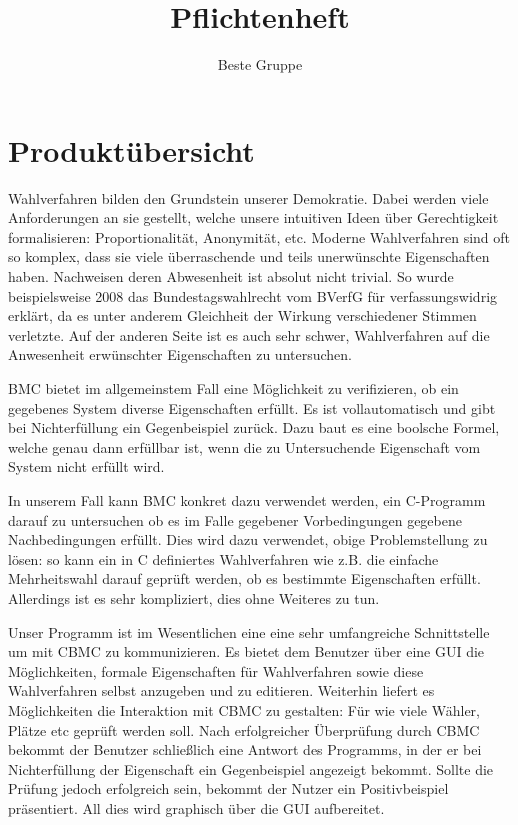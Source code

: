 \documentclass[a4paper]{scrreprt}
\begin{document}
\title{Pflichtenheft}
\author{Beste Gruppe}
\maketitle
 

\begin{acronym} %
\end{acronym}

\tableofcontents	
 
\chapter{Produktübersicht}
Wahlverfahren bilden den \gls{Grundstein} unserer Demokratie. Dabei werden viele Anforderungen an sie gestellt, welche unsere intuitiven Ideen über Gerechtigkeit formalisieren: Proportionalität, Anonymität, etc. Moderne Wahlverfahren sind oft so komplex, dass sie viele überraschende und teils unerwünschte Eigenschaften haben. Nachweisen deren Abwesenheit ist absolut nicht trivial. So wurde beispielsweise 2008 das Bundestagswahlrecht vom BVerfG für verfassungswidrig erklärt, da es unter anderem Gleichheit der Wirkung verschiedener Stimmen verletzte. Auf der anderen Seite ist es auch sehr schwer, Wahlverfahren auf die Anwesenheit erwünschter Eigenschaften zu untersuchen.

\ac{BMC} bietet im allgemeinstem Fall eine Möglichkeit zu verifizieren, ob ein gegebenes System diverse Eigenschaften erfüllt. Es ist vollautomatisch und gibt bei Nichterfüllung ein Gegenbeispiel zurück. Dazu baut es eine boolsche Formel, welche genau dann erfüllbar ist, wenn die zu Untersuchende Eigenschaft vom System nicht erfüllt wird. 

In unserem Fall kann \ac{BMC} konkret dazu verwendet werden, ein C-Programm darauf zu untersuchen ob es im Falle gegebener Vorbedingungen gegebene Nachbedingungen erfüllt. Dies wird dazu verwendet, obige Problemstellung zu lösen: so kann ein in C definiertes Wahlverfahren wie z.B. die einfache Mehrheitswahl darauf geprüft werden, ob es bestimmte Eigenschaften erfüllt. Allerdings ist es sehr kompliziert, dies ohne Weiteres zu tun. 

Unser Programm ist im Wesentlichen eine eine sehr umfangreiche Schnittstelle um mit \ac{CBMC} zu kommunizieren. Es bietet dem Benutzer über eine \ac{GUI} die Möglichkeiten, formale Eigenschaften für Wahlverfahren sowie diese Wahlverfahren selbst anzugeben und zu editieren. Weiterhin liefert es Möglichkeiten die Interaktion mit \ac{CBMC} zu gestalten: Für wie viele Wähler, Plätze etc geprüft werden soll. Nach erfolgreicher Überprüfung durch \ac{CBMC} bekommt der Benutzer schließlich eine Antwort des Programms, in der er bei Nichterfüllung der Eigenschaft ein Gegenbeispiel angezeigt bekommt. Sollte die Prüfung jedoch erfolgreich sein, bekommt der Nutzer ein Positivbeispiel präsentiert. All dies wird graphisch über die \ac{GUI} aufbereitet.
\end{document}

